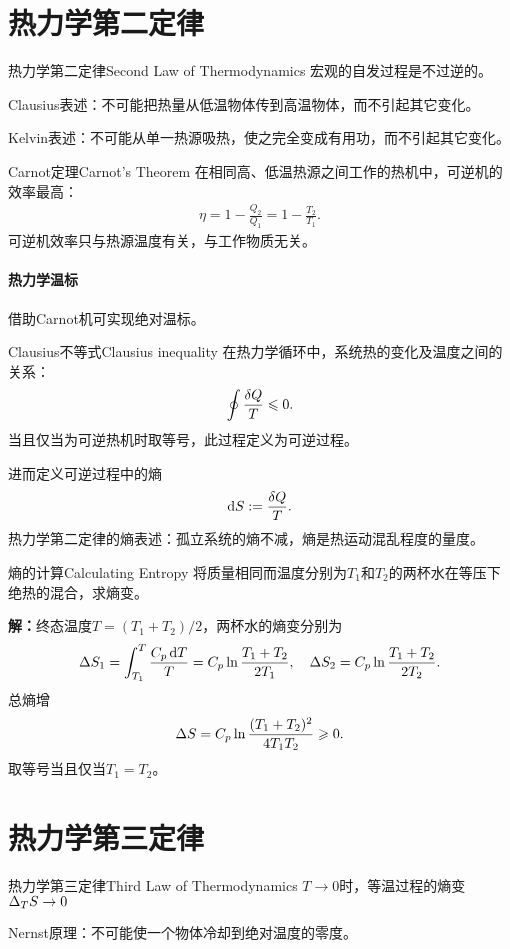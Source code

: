\section{热力学第二定律}
\begin{theorem}{热力学第二定律}{Second Law of Thermodynamics}
	宏观的自发过程是不过逆的。
	\begin{compactitem}
		\item Clausius表述：不可能把热量从低温物体传到高温物体，而不引起其它变化。
		\item Kelvin表述：不可能从单一热源吸热，使之完全变成有用功，而不引起其它变化。
	\end{compactitem}
\end{theorem}
\begin{theorem}{Carnot定理}{Carnot's Theorem}
	在相同高、低温热源之间工作的热机中，可逆机的效率最高：
	\begin{align}
		\eta=1-\frac{Q_2}{Q_1}=1-\frac{T_2}{T_1}.
	\end{align}
	可逆机效率只与热源温度有关，与工作物质无关。
\end{theorem}
\paragraph{热力学温标}借助Carnot机可实现绝对温标。
\begin{theorem}{Clausius不等式}{Clausius inequality}
	在热力学循环中，系统热的变化及温度之间的关系：
	\begin{equation}
		\oint\frac{\mathop{}\!\delta Q}T\leqslant 0.
	\end{equation}
	当且仅当为可逆热机时取等号，此过程定义为可逆过程。
\end{theorem}
进而定义可逆过程中的熵
\begin{align}
	\mathop{}\!\mathrm{d} S:=\frac{\mathop{}\!\delta Q}T.
\end{align}
热力学第二定律的熵表述：孤立系统的熵不减，熵是热运动混乱程度的量度。
\begin{example}{熵的计算}{Calculating Entropy}
	将质量相同而温度分别为$T_1$和$T_2$的两杯水在等压下绝热的混合，求熵变。

	\textbf{解：}终态温度$T=(T_1+T_2)/2$，两杯水的熵变分别为
	\[
		\Delta S_1=\int_{T_1}^T\frac{C_p\mathop{}\!\mathrm{d} T}T=C_p\ln\frac{T_1+T_2}{2T_1},\quad\Delta S_2=C_p\ln\frac{T_1+T_2}{2T_2}.
	\]
	总熵增
	\[
		\Delta S=C_p\ln\frac{(T_1+T_2)^2}{4T_1T_2}\geqslant 0.
	\]
	取等号当且仅当$T_1=T_2$。
\end{example}
\section{热力学第三定律}
\begin{theorem}{热力学第三定律}{Third Law of Thermodynamics}
	$T\to 0$时，等温过程的熵变$\Delta_TS\to 0$

	Nernst原理：不可能使一个物体冷却到绝对温度的零度。
\end{theorem}